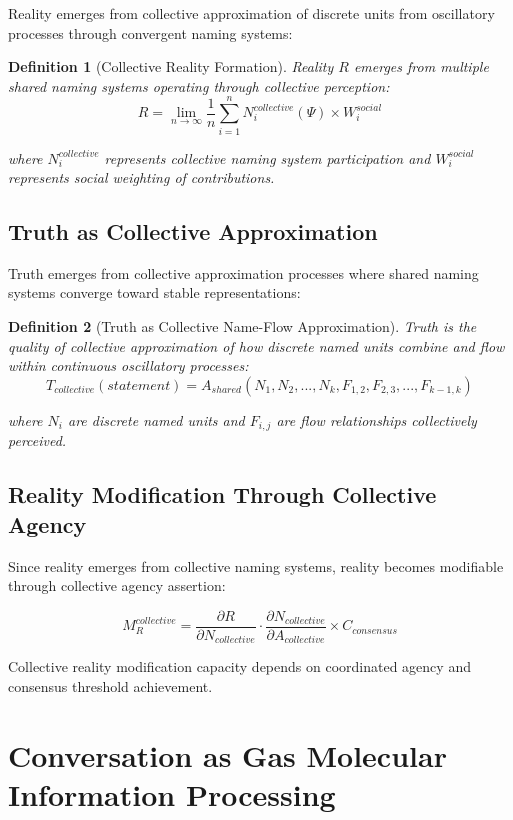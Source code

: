 \documentclass[12pt,a4paper]{article}
\newtheorem{definition}{Definition}
\begin{document}
Reality emerges from collective approximation of discrete units from oscillatory processes through convergent naming systems:

\begin{definition}[Collective Reality Formation]
Reality $R$ emerges from multiple shared naming systems operating through collective perception:
$$R = \lim_{n \to \infty} \frac{1}{n} \sum_{i=1}^{n} N_i^{collective}(\Psi) \times W_i^{social}$$

where $N_i^{collective}$ represents collective naming system participation and $W_i^{social}$ represents social weighting of contributions.
\end{definition}

\subsection{Truth as Collective Approximation}

Truth emerges from collective approximation processes where shared naming systems converge toward stable representations:

\begin{definition}[Truth as Collective Name-Flow Approximation]
Truth is the quality of collective approximation of how discrete named units combine and flow within continuous oscillatory processes:
$$T_{collective}(statement) = A_{shared}(N_1, N_2, ..., N_k, F_{1,2}, F_{2,3}, ..., F_{k-1,k})$$

where $N_i$ are discrete named units and $F_{i,j}$ are flow relationships collectively perceived.
\end{definition}

\subsection{Reality Modification Through Collective Agency}

Since reality emerges from collective naming systems, reality becomes modifiable through collective agency assertion:

\begin{equation}
M_R^{collective} = \frac{\partial R}{\partial N_{collective}} \cdot \frac{\partial N_{collective}}{\partial A_{collective}} \times C_{consensus}
\end{equation}

Collective reality modification capacity depends on coordinated agency and consensus threshold achievement.

\section{Conversation as Gas Molecular Information Processing}
\end{document}
